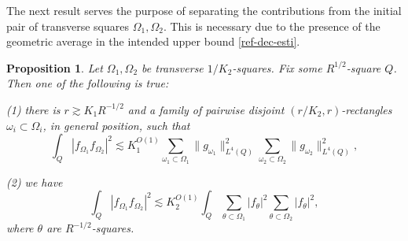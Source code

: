 \documentclass{amsart}%
\numberwithin{equation}{section}
\newtheorem{proposition}[theorem]{Proposition}
\newcommand{\1}{\mathbbm{1}}
\begin{document}
The next result serves the purpose of separating the contributions from the initial pair of transverse squares $\Omega_1,\Omega_2$. This is necessary due to the presence of the geometric average in the intended upper bound \eqref{ref-dec-esti}.	
\begin{proposition}
\label{rejgiotjgiotjio}	
Let $\Omega_1,\Omega_2$ be transverse $1/K_2$-squares. Fix some $R^{1/2}$-square $Q$. Then
one of the following is true:

(1) there is $r\gtrsim K_1 R^{-1/2}$ and a family of pairwise disjoint $(r/K_2,r)$-rectangles $\omega_i\subset \Omega_i$, in general position, such that
\begin{equation}
	\label{cccc1}
\int_{Q}|f_{\Omega_1}f_{\Omega_2}|^2\lesssim K_1^{O(1)}\sum_{\omega_1\subset \Omega_1}\|g_{\omega_1}\|_{L^4(Q)}^2\sum_{\omega_2\subset \Omega_2}\|g_{\omega_2}\|_{L^4(Q)}^2,
\end{equation}

(2) we have 
\begin{equation}
\label{cccc2}
\int_{Q}|f_{\Omega_1}f_{\Omega_2}|^2\lesssim K_2^{O(1)}
\int_Q\sum_{\theta\subset \Omega_1}|f_\theta|^2
\sum_{\theta\subset \Omega_2}|f_{\theta}|^2,
\end{equation}
where $\theta$ are $R^{-1/2}$-squares.
\end{proposition}	
\end{document}
